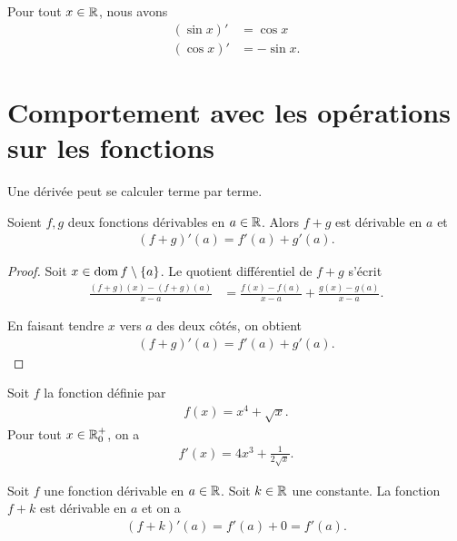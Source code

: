 \documentclass[main.tex]{subfiles}
\begin{document}
\begin{proposition}

    Pour tout $x \in \mathbb{R}$,
    nous avons
    \begin{align}
        (\sin x)' &= \cos x\\
        (\cos x)' &= -\sin x.
    \end{align}
\end{proposition}

\section{Comportement avec les opérations sur les fonctions}

Une dérivée peut se calculer terme par terme.

\begin{proposition}

    Soient $f, g$ deux fonctions dérivables en $a \in \mathbb{R}$.
    Alors $f + g$ est dérivable en $a$ et
    \begin{align}
        (f + g)'(a) = f'(a) + g'(a).
    \end{align}
\end{proposition}
\begin{proof}
    Soit $x \in \operatorname{dom} f \setminus \{a\}$.
    Le quotient différentiel de $f + g$ s'écrit
    \begin{align}
        \frac {(f + g)(x) - (f + g)(a)} {x - a}
        &= \frac {f(x) - f(a)} {x - a} + \frac {g(x) - g(a)} {x - a}.
    \end{align}

    En faisant tendre $x$ vers $a$ des deux côtés,
    on obtient
    \begin{align}
        (f + g)'(a) = f'(a) + g'(a).
    \end{align}
\end{proof}

\begin{example}
    Soit $f$ la fonction définie par 
    \begin{align}
        f(x) = x^4 + \sqrt x.
    \end{align}
    Pour tout $x \in \mathbb{R}_0^+$, on a 
    \begin{align}
        f'(x) = 4x^3 + \frac{1}{2\sqrt x}.
    \end{align}
\end{example}

\begin{example}
    [Dérivée de $f(x) + k$]
    Soit $f$ une fonction dérivable en $a \in \mathbb{R}$.
    Soit $k \in \mathbb{R}$ une constante. 
    La fonction $f + k$ est dérivable en $a$ et on a 
    \begin{align}
        (f + k)'(a) = f'(a) + 0 = f'(a).
    \end{align}
\end{example}
\end{document}
